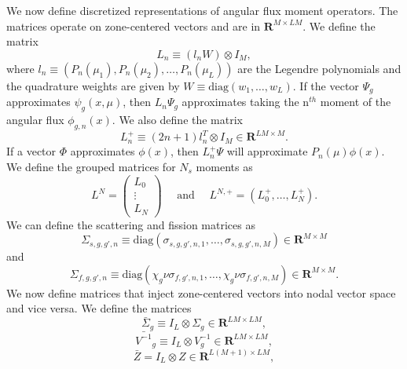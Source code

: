 We now define discretized representations of angular flux moment operators. The matrices operate on zone-centered vectors and are in $\mathbf{R}^{M \times LM}$. We define the matrix
\begin{equation}
	L_{n} \equiv (l_{n}W) \otimes I_{M},
\end{equation}
where $l_{n} \equiv (P_{n}(\mu_{1}), P_{n}(\mu_{2}), \dots, P_{n}(\mu_{L}))$ are the Legendre polynomials and the quadrature weights are given by $W \equiv \text{diag}(w_{1}, \dots, w_{L})$.
If the vector $\Psi_{g}$ approximates $\psi_{g}(x, \mu)$, then $L_{n}\Psi_{g}$ approximates taking the n$^{th}$ moment of the angular flux $\phi_{g,n}(x)$. We also define the matrix
\begin{equation}
	L_{n}^{+} \equiv (2n+1)l_{n}^{T} \otimes I_{M} \in \mathbf{R}^{LM \times M}.
\end{equation}
If a vector $\Phi$ approximates $\phi(x)$, then $L_{n}^{+}\Psi$ will approximate $P_{n}(\mu)\phi(x)$. We define the grouped matrices for $N_{s}$ moments as
\begin{equation}
L^{N} = \begin{pmatrix}
		L_{0} \\
		\vdots \\
		L_{N}
	     \end{pmatrix} \quad \text{ and } \quad
L^{N,+} = (L_{0}^{+}, \dots, L_{N}^{+}).
\end{equation}
We can define the scattering and fission matrices as
\begin{equation}
	\Sigma_{s,g,g',n} \equiv \text{diag}(\sigma_{s,g,g',n,1}, \dots, \sigma_{s,g,g',n,M}) \in \mathbf{R}^{M \times M}
\end{equation}
and
\begin{equation}
	\Sigma_{f,g,g',n} \equiv \text{diag}(\chi_{g}\nu\sigma_{f,g',n,1}, \dots, \chi_{g}\nu\sigma_{f,g',n,M}) \in \mathbf{R}^{M \times M}.
\end{equation}
We now define matrices that inject zone-centered vectors into nodal vector space and vice versa. We define the matrices
\begin{equation}
\bar{\Sigma}_{g} \equiv I_{L} \otimes \Sigma_{g} \in \mathbf{R}^{LM \times LM},
\end{equation}
\begin{equation}
\bar{V^{-1}}_{g} \equiv I_{L} \otimes V^{-1}_{g} \in \mathbf{R}^{LM \times LM},
\end{equation}
\begin{equation}
	\bar{Z} = I_{L} \otimes Z \in \mathbf{R}^{L(M+1) \times LM},
\end{equation}
